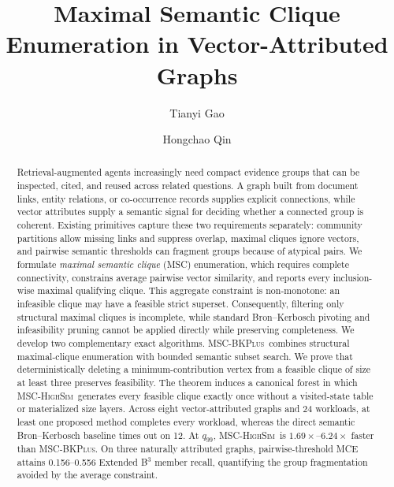 \documentclass[sigconf, nonacm]{acmart}
\newcommand{\subEnum}{MSC-\textsc{BKPlus}}
\newcommand{\monoSemMCE}{MSC-\textsc{HighSim}}
\begin{document}
\title{Maximal Semantic Clique Enumeration in Vector-Attributed Graphs}
\author{Tianyi Gao}

\author{Hongchao Qin}

\begin{abstract}
Retrieval-augmented agents increasingly need compact evidence groups that can
be inspected, cited, and reused across related questions. A graph built from
document links, entity relations, or co-occurrence records supplies explicit
connections, while vector attributes supply a semantic signal for deciding
whether a connected group is coherent. Existing primitives capture these two
requirements separately: community partitions allow missing links and suppress
overlap, maximal cliques ignore vectors, and pairwise semantic thresholds can
fragment groups because of atypical pairs. We formulate \emph{maximal semantic clique} (MSC) enumeration,
which requires complete connectivity, constrains average pairwise vector
similarity, and reports every inclusion-wise maximal qualifying clique. This
aggregate constraint is non-monotone: an infeasible clique may have a feasible
strict superset. Consequently, filtering only structural maximal cliques is
incomplete, while standard Bron--Kerbosch pivoting and infeasibility pruning
cannot be applied directly while preserving completeness. We develop two complementary exact algorithms. \subEnum\ combines
structural maximal-clique enumeration with bounded semantic subset search. We
prove that deterministically deleting a minimum-contribution vertex from a
feasible clique of size at least three preserves feasibility. The theorem
induces a canonical forest in which \monoSemMCE\ generates every feasible clique
exactly once without a visited-state table or materialized size layers. Across
eight vector-attributed graphs and 24 workloads, at least one proposed method
completes every workload, whereas the direct semantic Bron--Kerbosch baseline
times out on 12. At $q_{99}$, \monoSemMCE\ is
$1.69\times$--$6.24\times$ faster than \subEnum. On three naturally attributed
graphs, pairwise-threshold MCE attains 0.156--0.556 Extended B$^3$ member
recall, quantifying the group fragmentation avoided by the average constraint.
\end{abstract}
\maketitle
\end{document}
